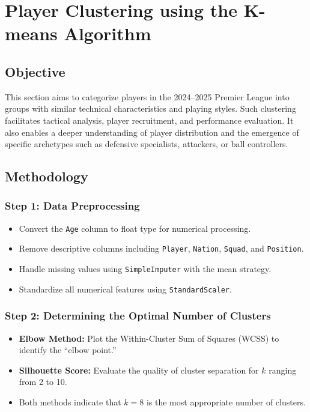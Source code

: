 \documentclass[12pt,a4paper]{article}
\begin{document}
\section{Player Clustering using the K-means Algorithm}

\subsection{Objective}
This section aims to categorize players in the 2024–2025 Premier League into groups with similar technical characteristics and playing styles. Such clustering facilitates tactical analysis, player recruitment, and performance evaluation. It also enables a deeper understanding of player distribution and the emergence of specific archetypes such as defensive specialists, attackers, or ball controllers.

\subsection{Methodology}

\subsubsection{Step 1: Data Preprocessing}
\begin{itemize}
    \item Convert the \texttt{Age} column to float type for numerical processing.
    \item Remove descriptive columns including \texttt{Player}, \texttt{Nation}, \texttt{Squad}, and \texttt{Position}.
    \item Handle missing values using \texttt{SimpleImputer} with the mean strategy.
    \item Standardize all numerical features using \texttt{StandardScaler}.
\end{itemize}

\subsubsection{Step 2: Determining the Optimal Number of Clusters}
\begin{itemize}
    \item \textbf{Elbow Method:} Plot the Within-Cluster Sum of Squares (WCSS) to identify the “elbow point.”
    \item \textbf{Silhouette Score:} Evaluate the quality of cluster separation for $k$ ranging from 2 to 10.
    \item Both methods indicate that $k = 8$ is the most appropriate number of clusters.
\end{itemize}
\end{document}

